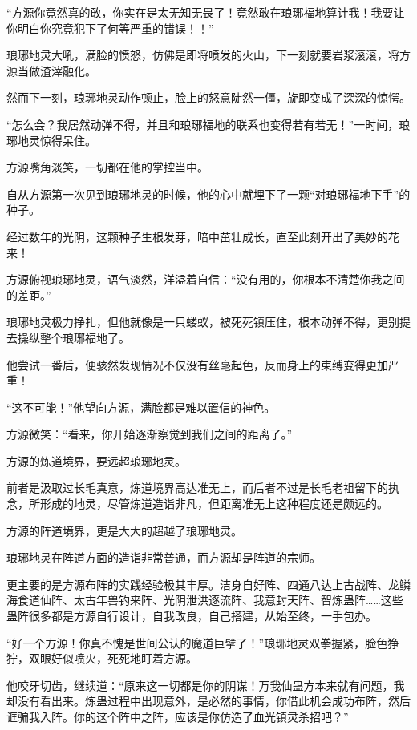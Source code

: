 
\begin{this_body}



“方源你竟然真的敢，你实在是太无知无畏了！竟然敢在琅琊福地算计我！我要让你明白你究竟犯下了何等严重的错误！！”

琅琊地灵大吼，满脸的愤怒，仿佛是即将喷发的火山，下一刻就要岩浆滚滚，将方源当做渣滓融化。

然而下一刻，琅琊地灵动作顿止，脸上的怒意陡然一僵，旋即变成了深深的惊愕。

“怎么会？我居然动弹不得，并且和琅琊福地的联系也变得若有若无！”一时间，琅琊地灵惊得呆住。

方源嘴角淡笑，一切都在他的掌控当中。

自从方源第一次见到琅琊地灵的时候，他的心中就埋下了一颗“对琅琊福地下手”的种子。

经过数年的光阴，这颗种子生根发芽，暗中茁壮成长，直至此刻开出了美妙的花来！

方源俯视琅琊地灵，语气淡然，洋溢着自信：“没有用的，你根本不清楚你我之间的差距。”

琅琊地灵极力挣扎，但他就像是一只蝼蚁，被死死镇压住，根本动弹不得，更别提去操纵整个琅琊福地了。

他尝试一番后，便骇然发现情况不仅没有丝毫起色，反而身上的束缚变得更加严重！

“这不可能！”他望向方源，满脸都是难以置信的神色。

方源微笑：“看来，你开始逐渐察觉到我们之间的距离了。”

方源的炼道境界，要远超琅琊地灵。

前者是汲取过长毛真意，炼道境界高达准无上，而后者不过是长毛老祖留下的执念，所形成的地灵，尽管炼道造诣非凡，但距离准无上这种程度还是颇远的。

方源的阵道境界，更是大大的超越了琅琊地灵。

琅琊地灵在阵道方面的造诣非常普通，而方源却是阵道的宗师。

更主要的是方源布阵的实践经验极其丰厚。洁身自好阵、四通八达上古战阵、龙鳞海食道仙阵、太古年兽钓来阵、光阴泄洪逐流阵、我意封天阵、智炼蛊阵……这些蛊阵很多都是方源自行设计，自我改良，自己搭建，从始至终，一手包办。

“好一个方源！你真不愧是世间公认的魔道巨擘了！”琅琊地灵双拳握紧，脸色狰狞，双眼好似喷火，死死地盯着方源。

他咬牙切齿，继续道：“原来这一切都是你的阴谋！万我仙蛊方本来就有问题，我却没有看出来。炼蛊过程中出现意外，是必然的事情，你借此机会成功布阵，然后诓骗我入阵。你的这个阵中之阵，应该是你仿造了血光镇灵杀招吧？”


\end{this_body}
